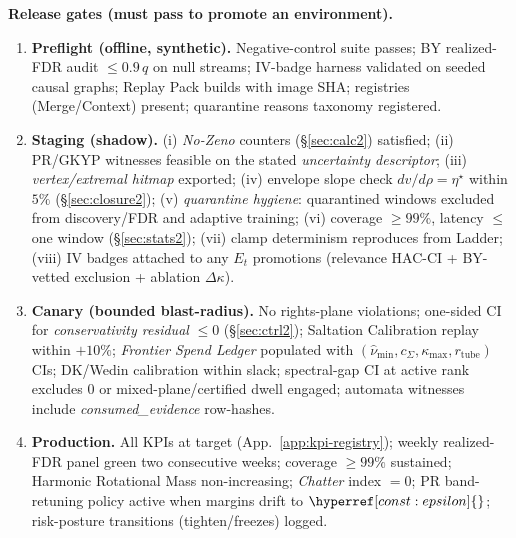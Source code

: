 \documentclass[10pt]{article}
\newcommand{\cutq}{q}
\newcommand{\constref}[1]{\hyperref[const:#1]{\ensuremath{\csname constsym#1\endcsname}}}
\begin{document}
\begin{constbox}
\textbf{Release gates (must pass to promote an environment).}
\begin{enumerate}[leftmargin=*]
\item \textbf{Preflight (offline, synthetic).}
Negative-control suite passes; BY realized-FDR audit $\le 0.9\,\cutq$ on null streams; IV-badge harness validated on seeded causal graphs; Replay Pack builds with image SHA; registries (Merge/Context) present; quarantine reasons taxonomy registered.
\item \textbf{Staging (shadow).}
(i) \emph{No-Zeno} counters (\S\ref{sec:calc2}) satisfied; (ii) PR/GKYP witnesses feasible on the stated \emph{uncertainty descriptor}; (iii) \emph{vertex/extremal hitmap} exported; (iv) envelope slope check $dv/d\rho{=}\eta^\star$ within $5\%$ (\S\ref{sec:closure2}); (v) \emph{quarantine hygiene}: quarantined windows excluded from discovery/FDR and adaptive training; (vi) coverage $\ge 99\%$, latency $\le$ one window (\S\ref{sec:stats2}); (vii) clamp determinism reproduces from Ladder; (viii) IV badges attached to any $E_t$ promotions (relevance HAC-CI + BY-vetted exclusion + ablation $\Delta\kappa$).
\item \textbf{Canary (bounded blast-radius).}
No rights-plane violations; one-sided CI for \emph{conservativity residual} $\le 0$ (\S\ref{sec:ctrl2}); Saltation Calibration replay within $+10\%$; \emph{Frontier Spend Ledger} populated with $(\hat\nu_{\min},c_\Sigma,\kappa_{\max},r_{\mathrm{tube}})$ CIs; DK/Wedin calibration within slack; spectral-gap CI at active rank excludes $0$ or mixed-plane/certified dwell engaged; automata witnesses include \emph{consumed\_evidence} row-hashes.
\item \textbf{Production.}
All KPIs at target (App.~\ref{app:kpi-registry}); weekly realized-FDR panel green two consecutive weeks; coverage $\ge 99\%$ sustained; Harmonic Rotational Mass non-increasing; \emph{Chatter} index $=0$; PR band-retuning policy active when margins drift to $\constref{epsilon}$; risk-posture transitions (tighten/freezes) logged.
\end{enumerate}
\end{constbox}

\end{document}
